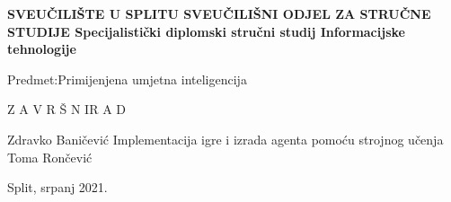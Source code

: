%
%
\begin{titlepage}
	\bfseries
	\headerdata
	{SVEUČILIŠTE U SPLITU}
	{SVEUČILIŠNI ODJEL ZA STRUČNE STUDIJE}
	{Specijalistički diplomski stručni studij Informacijske tehnologije}
	
	\vspace*{5cm}
	\begin{flushleft}
		{\large   Predmet:\normalfont\space Primijenjena umjetna inteligencija}
	\end{flushleft}
	\vspace*{3cm}
	
	\begin{center}
		{\LARGE {Z A V R Š N I\space\space\space R A D}}
	\end{center}
	\vspace*{2cm}
	
	\thesisdata
	{Zdravko Baničević}
	{Implementacija igre i izrada agenta pomoću strojnog učenja}
	{Toma Rončević}
	
	\begin{center}
		\vfill
		{\large\normalfont Split, srpanj 2021.}
	\end{center}
\end{titlepage}
%
%